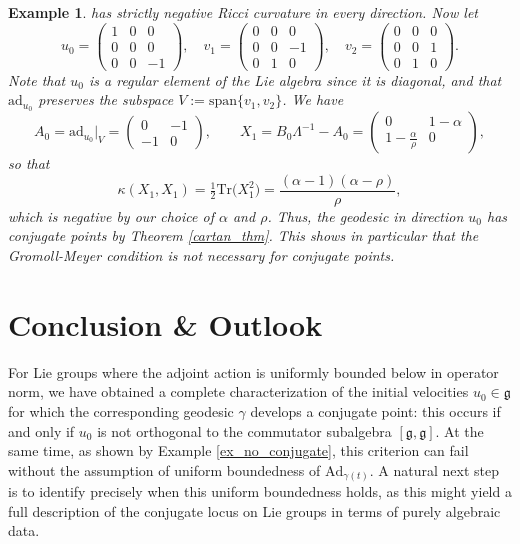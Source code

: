 \documentclass[oneside, 11pt]{amsart}
\newtheorem{example}[theorem]{Example}
\numberwithin{equation}{section}
\newcommand{\ad}{\mathrm{ad}}
\newcommand{\bim}{\kappa}
\newcommand{\adop}{A}
\newcommand{\adlambop}{B}
\newcommand{\mattyone}{X_1}
\begin{document}
\begin{example}
has strictly negative Ricci curvature  in every direction. Now let
\begin{equation*}
u_0 =
\left(\begin{matrix} 
1 & 0 & 0 \\
0 & 0 & 0 \\
0 & 0 & -1
\end{matrix}\right), \quad 
v_1 =
\left(\begin{matrix} 
0 & 0 & 0 \\
0 & 0 & -1 \\
0 & 1 & 0
\end{matrix}\right),
\quad
v_2 =
\left(\begin{matrix} 
0 & 0 & 0 \\
0 & 0 & 1 \\
0 & 1 & 0
\end{matrix}\right).
\end{equation*}
Note that $u_0$ is a regular element of the Lie algebra since it is diagonal, and that $\ad_{u_0}$ preserves the subspace $V := \mathrm{span}\{v_1, v_2\}$. We have
\begin{equation*}
\adop_0 = \ad_{u_0}|_V = \left(\begin{matrix} 
0 & -1 \\
-1 & 0
\end{matrix}\right), \qquad 
\mattyone = \adlambop_0\Lambda^{-1}-\adop_0 = \left(\begin{matrix} 
0 & 1-\alpha \\
1-\frac{\alpha}{\rho} & 0
\end{matrix}\right),
\end{equation*}
so that
\begin{equation*}
\bim(\mattyone,\mattyone) = 
\tfrac{1}{2} \mathrm{Tr}\big(\mattyone^2\big) = \frac{
(\alpha-1)(\alpha-\rho)}{\rho},
\end{equation*}
which is negative by our choice of $\alpha$ and $\rho$. Thus, the geodesic in direction $u_0$ has conjugate points by Theorem \ref{cartan_thm}. This shows in particular that the Gromoll-Meyer condition is not necessary for conjugate points.
\end{example}


\section{Conclusion \& Outlook}

For Lie groups where the adjoint action is uniformly bounded below in operator norm, we have obtained a complete characterization of the initial velocities $u_0 \in \mathfrak{g}$ for which the corresponding geodesic $\gamma$ develops a conjugate point: this occurs if and only if $u_0$ is not orthogonal to the commutator subalgebra $[\mathfrak{g}, \mathfrak{g}]$. At the same time, as shown by Example \ref{ex_no_conjugate}, this criterion can fail without the assumption of uniform boundedness of $\mathrm{Ad}_{\gamma(t)}$. A natural next step is to identify precisely when this uniform boundedness holds, as this might yield a full description of the conjugate locus on Lie groups in terms of purely algebraic data.
\end{document}
